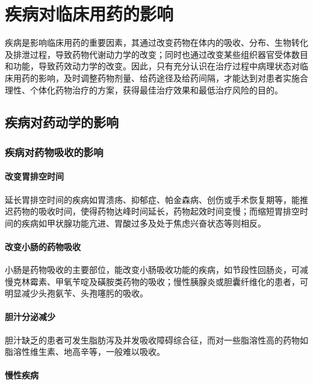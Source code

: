 \chapter{疾病对临床用药的影响}

疾病是影响临床用药的重要因素，其通过改变药物在体内的吸收、分布、生物转化及排泄过程，导致药物代谢动力学的改变；同时也通过改变某些组织器官受体数目和功能，导致药效动力学的改变。因此，只有充分认识在治疗过程中病理状态对临床用药的影响，及时调整药物剂量、给药途径及给药间隔，才能达到对患者实施合理性、个体化药物治疗的方案，获得最佳治疗效果和最低治疗风险的目的。

\section{疾病对药动学的影响}

\subsection{疾病对药物吸收的影响}

\subsubsection{改变胃排空时间}

延长胃排空时间的疾病如胃溃疡、抑郁症、帕金森病、创伤或手术恢复期等，能推迟药物的吸收时间，使得药物达峰时间延长，药物起效时间变慢；而缩短胃排空时间的疾病如甲状腺功能亢进、胃酸过多及处于焦虑兴奋状态等则相反。

\subsubsection{改变小肠的药物吸收}

小肠是药物吸收的主要部位，能改变小肠吸收功能的疾病，如节段性回肠炎，可减慢克林霉素、甲氧苄啶及磺胺类药物的吸收；慢性胰腺炎或胆囊纤维化的患者，可明显减少头孢氨苄、头孢噻肟的吸收。

\subsubsection{胆汁分泌减少}

胆汁缺乏的患者可发生脂肪泻及并发吸收障碍综合征，而对一些脂溶性高的药物如脂溶性维生素、地高辛等，一般难以吸收。

\subsubsection{慢性疾病}

